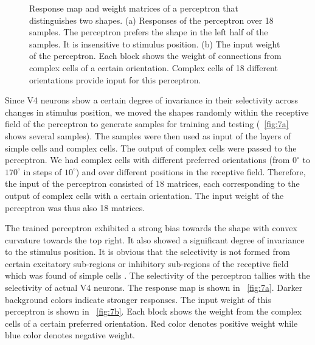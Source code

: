 \documentclass[conference]{IEEEtran}
\begin{document}
\begin{figure}[htp]
\centering
{}\hfil
{}
\caption{Response map and weight matrices of a perceptron that distinguishes two shapes.
(a) Responses of the perceptron over 18 samples.
The perceptron prefers the shape in the left half of the samples.
It is insensitive to stimulus position.
(b) The input weight of the perceptron. 
Each block shows the weight of connections from complex cells of a certain orientation.
Complex cells of 18 different orientations provide input for this perceptron.}
\label{fig:7}
\end{figure}

Since V4 neurons show a certain degree of invariance in their selectivity across changes in stimulus position,
we moved the shapes randomly within the receptive field of the perceptron 
to generate samples for training and testing (\figurename~\ref{fig:7a} shows several samples).
The samples were then used as input of the layers of simple cells and complex cells.
The output of complex cells were passed to the perceptron.
We had complex cells with different preferred orientations 
(from $0^\circ$ to $170^\circ$ in steps of $10^\circ$) and over different positions in the receptive field.
Therefore, the input of the perceptron consisted of 18 matrices, 
each corresponding to the output of complex cells with a certain orientation.
The input weight of the perceptron was thus also 18 matrices.

The trained perceptron exhibited a strong bias towards the shape with convex curvature towards the top right.
It also showed a significant degree of invariance to the stimulus position.
It is obvious that the selectivity is not formed from certain excitatory sub-regions
or inhibitory sub-regions of the receptive field which was found of simple cells \cite{hubel1962,pasupathy2001}.
The selectivity of the perceptron tallies with the selectivity of actual V4 neurons.
The response map is shown in \figurename~\ref{fig:7a}.
Darker background colors indicate stronger responses.
The input weight of this perceptron is shown in \figurename~\ref{fig:7b}.
Each block shows the weight from the complex cells of a certain preferred orientation.
Red color denotes positive weight while blue color denotes negative weight.
\end{document}
